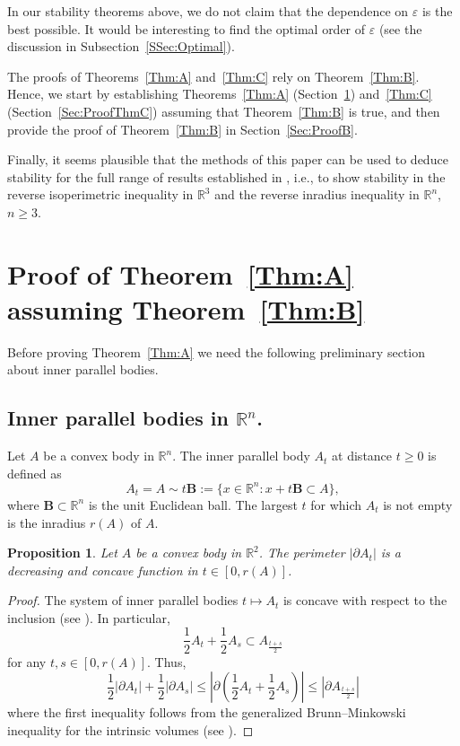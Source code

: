 \documentclass[11pt, oneside]{amsart}
\newcommand{\R}{\mathbb{R}}
\newcommand{\B}{{\bm B}}
\newcommand{\eps}{\varepsilon}
\renewcommand{\ge}{\geqslant}
\theoremstyle{theorem}
\newtheorem{proposition}[theorem]{Proposition}
\theoremstyle{Intro}
\theoremstyle{definition}
\theoremstyle{remark}
\theoremstyle{claim}
\numberwithin{equation}{section}
\begin{document}
In our stability theorems above, we do not claim that the dependence on $\eps$ is the best possible. It would be interesting to find the optimal order of $\eps$ (see the discussion in Subsection~\ref{SSec:Optimal}). 


The proofs of Theorems~\ref{Thm:A} and~\ref{Thm:C} rely on Theorem~\ref{Thm:B}. Hence, we start by establishing Theorems~\ref{Thm:A} (Section~\ref{Sec:ProofThmA}) and~\ref{Thm:C} (Section~\ref{Sec:ProofThmC}) assuming that Theorem~\ref{Thm:B} is true, and then provide the proof of Theorem~\ref{Thm:B} in Section~\ref{Sec:ProofB}.  

Finally, it seems plausible that the methods of this paper can be used to deduce stability for the full range of results established in \cite{DrTa}, i.e., to show stability in the reverse isoperimetric inequality in $\R^3$ and the reverse inradius inequality in $\R^n$, $n \ge 3$. 

\section{Proof of Theorem~\ref{Thm:A} assuming Theorem~\ref{Thm:B}}
\label{Sec:ProofThmA}
Before proving Theorem~\ref{Thm:A} we need the following preliminary section about inner parallel bodies.

\subsection{Inner parallel bodies in $\mathbb{R}^n$.}
Let $A$ be a convex body in $\R^n$. The inner parallel body $A_t$ at distance $t \geq 0$ is defined as
$$
A_t = A \sim t \B := \{x \in \R^n : x + t \B \subset A\}, 
$$
where $\B \subset \mathbb{R}^n$ is the unit Euclidean ball. The largest $t$ for which $A_t$ is not empty is the inradius $r(A)$ of $A$.  


\begin{proposition}
\label{Prop:Concave}
    Let $A$ be a convex body in $\R^2$. The perimeter $|\partial A_t|$ is a decreasing and concave function in $t \in [0, r(A)]$.
\end{proposition}
\begin{proof}
The system of inner parallel bodies $t \mapsto A_t$ is concave with respect to the inclusion (see \cite[Lemma 3.1.13]{Sch}). In particular,
$$
\frac12 A_{t} + \frac12 A_{s} \subset A_{\frac{t+s}2} 
$$
for any $t, s \in [0, r(A)]$. Thus,
$$
\frac12  |\partial A_t| + \frac12 |\partial A_s|  \leq \left|\partial \left(\frac12 A_{t} + \frac12 A_{s}\right)\right| \leq \left|\partial A_{\frac{t+s}2}\right| 
$$
where the first inequality follows from the generalized Brunn--Minkowski inequality for the intrinsic volumes (see \cite[Theorem 7.4.5]{Sch}). 
\end{proof}
\end{document}
